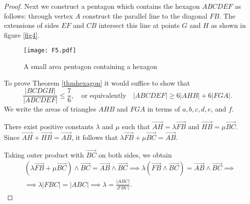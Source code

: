 \documentclass [10pt,oneside]{amsart}
\theoremstyle{definition}
\theoremstyle{plain}
\begin{document}
\begin{proof}
Next we construct a pentagon which contains the hexagon $ABCDEF$ as follows: through vertex $A$ construct the parallel line to the diagonal $FB$. The extensions of sides $EF$ and $CB$ intersect this line at points $G$ and $H$ as shown in figure \ref{fig4}.

\begin{figure}[ht]
\centering
\texttt{[image: F5.pdf]}
\vspace{-0.5cm}
\caption{\small{A small area pentagon containing a hexagon}}
\label{fig5}
\end{figure}




To prove Theorem \ref{thmhexagon} it would suffice to show that
\begin{equation}\label{wtshex}
\frac{|BCDGH|}{|ABCDEF|}\le \frac{7}{6}, \quad \text{or equivalently}\quad |ABCDEF|\ge 6|AHB|+6|FGA|.
\end{equation}
We write the areas of triangles $AHB$ and $FGA$ in terms of $a, b, c, d, e$, and $f$.

There exist positive constants $\lambda$ and $\mu$ such that
$\overrightarrow{AH}=\lambda\overrightarrow{FB}$ and $\overrightarrow{HB}=\mu\overrightarrow{BC}$.
Since $\overrightarrow{AH}+\overrightarrow{HB}=\overrightarrow{AB}$, it follows that
$\lambda\overrightarrow{FB}+\mu\overrightarrow{BC}=\overrightarrow{AB}$.

Taking outer product with $\overrightarrow{BC}$ on both sides, we obtain
\begin{align*}
&(\lambda\overrightarrow{FB}+\mu\overrightarrow{BC})\wedge \overrightarrow{BC}=\overrightarrow{AB} \wedge\overrightarrow{BC}
\implies \lambda(\overrightarrow{FB}\wedge\overrightarrow{BC})=\overrightarrow{AB}\wedge\overrightarrow{BC}\implies\\
&\implies \lambda|FBC|=|ABC|\implies \lambda=\frac{|ABC|}{|FBC|}.
\end{align*}


\end{proof}
\end{document}
